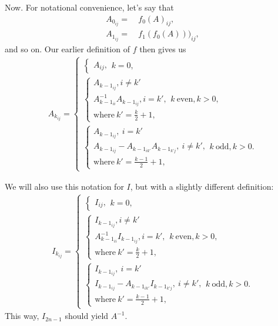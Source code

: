\documentclass[12pt]{article}
\begin{document}
\begin{enumerate}
    Now. For notational convenience, let's say that
    \begin{align*}
      A_{0_{ij}} =&\ f_0(A)_{ij},\\
      A_{1_{ij}} =&\ f_1(f_0(A)))_{ij},
    \end{align*}
    and so on. Our earlier definition of $f$ then gives us
    \begin{align*}
      A_{k_{ij}} =
      \begin{cases}
        \begin{cases}
          A_{ij},
        \end{cases} k = 0,\\
        \begin{cases}
          A_{k-1_{ij}}, i \neq k'\\
          A_{k-1_{ii}}^{-1}A_{k-1_{ij}}, i = k',\\
          \text{where}\ k' = \frac{k}{2} + 1,
        \end{cases} k\ \text{even}, k > 0,\\
        \begin{cases}
          A_{k-1_{ij}},\ i = k'\\
          A_{k-1_{ij}} - A_{k-1_{ik'}}A_{k-1_{k'j}},\ i \neq k',\\
          \text{where}\ k' = \frac{k - 1}{2} + 1,
        \end{cases} k\ \text{odd}, k > 0.
      \end{cases}
    \end{align*}

    We will also use this notation for $I$, but with a slightly
    different definition:
    \begin{align*}
      I_{k_{ij}} =
      \begin{cases}
        \begin{cases}
          I_{ij},
        \end{cases} k = 0,\\
        \begin{cases}
          I_{k-1_{ij}}, i \neq k'\\
          A_{k-1_{ii}}^{-1}I_{k-1_{ij}}, i = k',\\
          \text{where}\ k' = \frac{k}{2} + 1,
        \end{cases} k\ \text{even}, k > 0,\\
        \begin{cases}
          I_{k-1_{ij}},\ i = k'\\
          I_{k-1_{ij}} - A_{k-1_{ik'}}I_{k-1_{k'j}},\ i \neq k',\\
          \text{where}\ k' = \frac{k - 1}{2} + 1,
        \end{cases} k\ \text{odd}, k > 0.
      \end{cases}
    \end{align*}
    This way, $I_{2n-1}$ should yield $A^{-1}$.


\end{enumerate}
\end{document}
